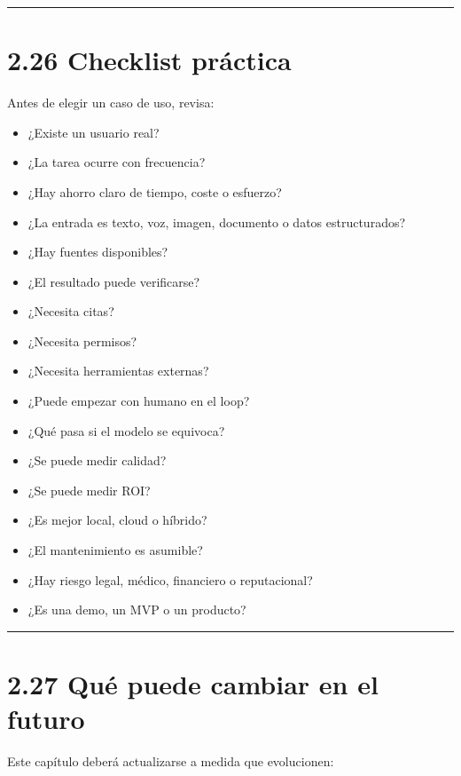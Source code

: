\begin{center}\rule{0.5\linewidth}{0.5pt}\end{center}

\section{2.26 Checklist práctica}\label{checklist-pruxe1ctica-1}

Antes de elegir un caso de uso, revisa:

\begin{itemize}
\tightlist
\item
  ¿Existe un usuario real?
\item
  ¿La tarea ocurre con frecuencia?
\item
  ¿Hay ahorro claro de tiempo, coste o esfuerzo?
\item
  ¿La entrada es texto, voz, imagen, documento o datos estructurados?
\item
  ¿Hay fuentes disponibles?
\item
  ¿El resultado puede verificarse?
\item
  ¿Necesita citas?
\item
  ¿Necesita permisos?
\item
  ¿Necesita herramientas externas?
\item
  ¿Puede empezar con humano en el loop?
\item
  ¿Qué pasa si el modelo se equivoca?
\item
  ¿Se puede medir calidad?
\item
  ¿Se puede medir ROI?
\item
  ¿Es mejor local, cloud o híbrido?
\item
  ¿El mantenimiento es asumible?
\item
  ¿Hay riesgo legal, médico, financiero o reputacional?
\item
  ¿Es una demo, un MVP o un producto?
\end{itemize}

\begin{center}\rule{0.5\linewidth}{0.5pt}\end{center}

\section{2.27 Qué puede cambiar en el
futuro}\label{quuxe9-puede-cambiar-en-el-futuro-1}

Este capítulo deberá actualizarse a medida que evolucionen:

